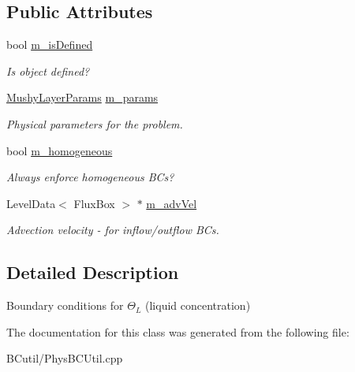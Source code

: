 \subsection*{Public Attributes}
\begin{DoxyCompactItemize}
\item 
\hypertarget{class_basic_theta_l_b_c_function_a71d48d40e86436b6c05760c090de93df}{bool \hyperlink{class_basic_theta_l_b_c_function_a71d48d40e86436b6c05760c090de93df}{m\-\_\-is\-Defined}}\label{class_basic_theta_l_b_c_function_a71d48d40e86436b6c05760c090de93df}

\begin{DoxyCompactList}\small\item\em Is object defined? \end{DoxyCompactList}\item 
\hypertarget{class_basic_theta_l_b_c_function_a86c2452543093d0707ebbf78a949de32}{\hyperlink{class_mushy_layer_params}{Mushy\-Layer\-Params} \hyperlink{class_basic_theta_l_b_c_function_a86c2452543093d0707ebbf78a949de32}{m\-\_\-params}}\label{class_basic_theta_l_b_c_function_a86c2452543093d0707ebbf78a949de32}

\begin{DoxyCompactList}\small\item\em Physical parameters for the problem. \end{DoxyCompactList}\item 
\hypertarget{class_basic_theta_l_b_c_function_aa4f0af2f17b19f2d170329c7700fdbaf}{bool \hyperlink{class_basic_theta_l_b_c_function_aa4f0af2f17b19f2d170329c7700fdbaf}{m\-\_\-homogeneous}}\label{class_basic_theta_l_b_c_function_aa4f0af2f17b19f2d170329c7700fdbaf}

\begin{DoxyCompactList}\small\item\em Always enforce homogeneous B\-Cs? \end{DoxyCompactList}\item 
\hypertarget{class_basic_theta_l_b_c_function_acdbb12a76526084884f0007aab276680}{Level\-Data$<$ Flux\-Box $>$ $\ast$ \hyperlink{class_basic_theta_l_b_c_function_acdbb12a76526084884f0007aab276680}{m\-\_\-adv\-Vel}}\label{class_basic_theta_l_b_c_function_acdbb12a76526084884f0007aab276680}

\begin{DoxyCompactList}\small\item\em Advection velocity -\/ for inflow/outflow B\-Cs. \end{DoxyCompactList}\end{DoxyCompactItemize}


\subsection{Detailed Description}
Boundary conditions for $\Theta_L$ (liquid concentration) 

The documentation for this class was generated from the following file\-:\begin{DoxyCompactItemize}
\item 
B\-Cutil/Phys\-B\-C\-Util.\-cpp\end{DoxyCompactItemize}
